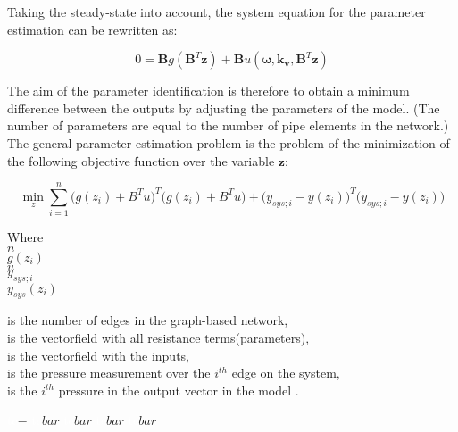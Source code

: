 Taking the steady-state into account, the system equation for the parameter estimation can be rewritten as: 

\begin{equation}
 0 = \pmb{B} g(\pmb{B}^T \pmb{z})+ \pmb{B} u(\pmb{\omega},\pmb{k_v}, \pmb{B}^T \pmb{z})
 \label{InputOutputmodel_steadystate}
\end{equation}

The aim of the parameter identification is therefore to obtain a minimum difference between the outputs by adjusting the parameters of the model. (The number of parameters are equal to the number of pipe elements in the network.) The general parameter estimation problem is the problem of the minimization of the following objective function over the variable $\pmb{z}$: 

%
%

 \begin{equation}
 \min_{z} \sum_{i=1}^{n}\Big(g(z_i) + B^Tu\Big)^T \Big(g(z_i)     + B^Tu\Big) + \big(y_{sys;i} - y(z_i)\big)^T  \big(y_{sys;i} - y(z_i)\big)
  \label{ObjectiveFunction}
 \end{equation}
 
\begin{minipage}[t]{0.20\textwidth}
Where\\
\hspace*{8mm} $n$ \\
\hspace*{8mm} $g(z_i)$ \\
\hspace*{8mm} $u$ \\
\hspace*{8mm} $y_{sys;i}$ \\
\hspace*{8mm} $y_{sys}(z_i)$ 
\end{minipage}
\begin{minipage}[t]{0.68\textwidth}
\vspace*{2mm}
is the number of edges in the graph-based network,\\
is the vectorfield with all resistance terms(parameters),\\
is the vectorfield with the inputs,\\
is the pressure measurement over the $i^{th}$ edge on the system,\\
is the $i^{th}$ pressure in the output vector in the model .
\end{minipage}
\begin{minipage}[t]{0.10\textwidth}
\vspace*{2mm}
\textcolor{White}{te}$\unit{-}$
\textcolor{White}{te}$\unit{bar}$
\textcolor{White}{te}$\unit{bar}$
\textcolor{White}{te}$\unit{bar}$
\textcolor{White}{te}$\unit{bar}$
\end{minipage}

